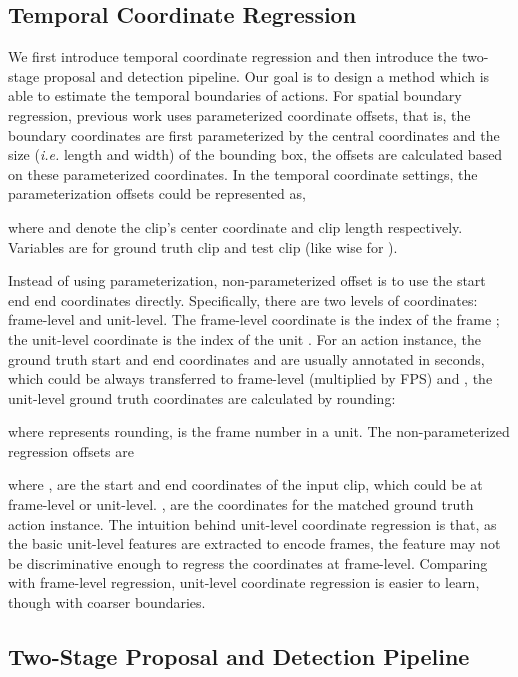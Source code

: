 \documentclass{bmvc2k}
\begin{document}
\subsection{Temporal Coordinate Regression}
We first introduce temporal coordinate regression and then introduce the two-stage proposal and detection pipeline. Our goal is to design a method which is able to estimate the temporal boundaries of actions. For spatial boundary regression, previous work \cite{ren2015faster, girshick2015fast} uses parameterized coordinate offsets, that is, the boundary coordinates are first parameterized by the central coordinates and the size (\emph{i.e.} length and width) of the bounding box, the offsets are calculated based on these parameterized coordinates. In the temporal coordinate settings, the parameterization offsets could be represented as, 


where  and  denote the clip's center coordinate and clip length respectively. Variables  are for ground truth clip and test clip (like wise for ). 

Instead of using parameterization, non-parameterized offset is to use the start end end coordinates directly. Specifically, there are two levels of coordinates: frame-level and unit-level. The frame-level coordinate is the index of the frame ; the unit-level coordinate is the index of the unit . For an action instance, the ground truth start and end coordinates  and  are usually annotated in seconds, which could be always transferred to frame-level (multiplied by FPS)  and , the unit-level ground truth coordinates are calculated by rounding:

where  represents rounding,  is the frame number in a unit. The non-parameterized regression offsets are

where ,  are the start and end coordinates of the input clip, which could be at frame-level or unit-level. ,  are the coordinates for the matched ground truth action instance. The intuition behind unit-level coordinate regression is that, as the basic unit-level features are extracted to encode  frames, the feature may not be discriminative enough to regress the coordinates at frame-level. Comparing with frame-level regression, unit-level coordinate regression is easier to learn, though with coarser boundaries. 


\subsection{Two-Stage Proposal and Detection Pipeline}
\end{document}
